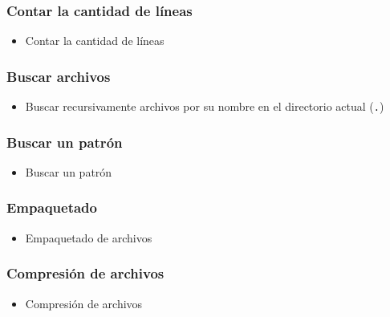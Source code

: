 \begin{frame}
  \frametitle{Contar la cantidad de líneas}
  \begin{itemize}
    \item Contar la cantidad de líneas
  \end{itemize}
\end{frame}

\begin{frame}
  \frametitle{Buscar archivos}
  \begin{itemize}
    \item Buscar recursivamente archivos por su nombre en el directorio actual (\texttt{.})
  \end{itemize}
\end{frame}

\begin{frame}
  \frametitle{Buscar un patrón}
  \begin{itemize}
    \item Buscar un patrón
  \end{itemize}
\end{frame}

\begin{frame}
  \frametitle{Empaquetado}
  \begin{itemize}
    \item Empaquetado de archivos
  \end{itemize}
\end{frame}

\begin{frame}
  \frametitle{Compresión de archivos}
  \begin{itemize}
    \item Compresión de archivos
  \end{itemize}
\end{frame}

